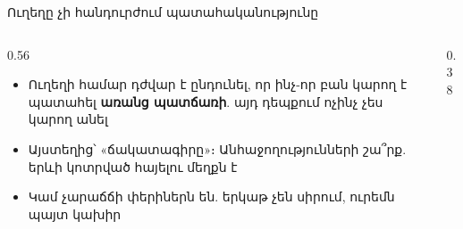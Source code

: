 \begin{frame}{Ուղեղը չի հանդուրժում պատահականությունը}
  \begin{columns}[c]
    \begin{column}{0.56\textwidth}
      \begin{itemize}
        \item Ուղեղի համար դժվար է ընդունել, որ ինչ-որ բան կարող է պատահել \textbf{առանց պատճառի}. այդ դեպքում ոչինչ չես կարող անել
        \item<2-> Այստեղից՝ «ճակատագիրը»։ Անհաջողությունների շա՞րք. երևի կոտրված հայելու մեղքն է 
        \item<3-> Կամ չարաճճի փերիներն են. երկաթ չեն սիրում, ուրեմն պայտ կախիր
      \end{itemize}
    \end{column}
    \begin{column}{0.38\textwidth}
      \centering
    \end{column}
  \end{columns}
  \vspace{2mm}
\end{frame}

